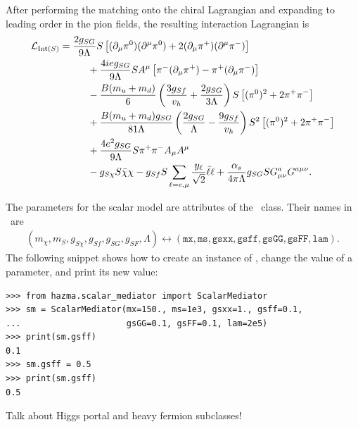 After performing the matching onto the chiral Lagrangian and expanding to leading order in the pion fields, the resulting interaction Lagrangian is
\begin{align}
    \mathcal{L}_{\mathrm{Int}(S)} &= \frac{2 g_{SG}}{9 \Lambda} S \left[ (\partial_\mu \pi^0) (\partial^\mu \pi^0) + 2 (\partial_\mu \pi^+) (\partial^\mu \pi^-) \right]\\
                         &\hspace{1cm} + \frac{4 i e g_{SG}}{9 \Lambda} S A^\mu \left[ \pi^- (\partial_\mu \pi^+) - \pi^+ (\partial_\mu \pi^-) \right]\\
                         &\hspace{1cm} - \frac{B (m_u + m_d)}{6} \left( \frac{3 g_{Sf}}{v_h} + \frac{2 g_{SG}}{3 \Lambda} \right) S \left[ (\pi^0)^2 + 2 \pi^+ \pi^- \right]\\
                         &\hspace{1cm} + \frac{B (m_u + m_d) g_{SG}}{81 \Lambda} \left( \frac{2 g_{SG}}{\Lambda} - \frac{9 g_{Sf}}{v_h} \right) S^2 \left[ (\pi^0)^2 + 2 \pi^+ \pi^- \right]\\
                         &\hspace{1cm} + \frac{4 e^2 g_{SG}}{9\Lambda} S \pi^+ \pi^- A_\mu A^\mu\\
                         &\hspace{1cm} - g_{S \chi} S \bar{\chi} \chi - g_{Sf} S \sum_{\ell=e,\mu} \frac{y_\ell}{\sqrt{2}} \bar{\ell} \ell + \frac{\alpha_s}{4\pi \Lambda} g_{SG} S G_{\mu\nu}^a G^{a \mu\nu}.
\end{align}

The parameters for the scalar model are attributes of the \sm\ class. Their names in \hazma\ are
\begin{align*}
    (m_\chi, m_S, g_{S\chi}, g_{Sf}, g_{SG}, g_{SF}, \Lambda) \leftrightarrow (\mathtt{mx}, \mathtt{ms}, \mathtt{gsxx}, \mathtt{gsff}, \mathtt{gsGG}, \mathtt{gsFF}, \mathtt{lam}).
\end{align*}
The following snippet shows how to create an instance of \sm, change the value of a parameter, and print its new value:
\begin{verbatim}
>>> from hazma.scalar_mediator import ScalarMediator
>>> sm = ScalarMediator(mx=150., ms=1e3, gsxx=1., gsff=0.1,
...                     gsGG=0.1, gsFF=0.1, lam=2e5)
>>> print(sm.gsff)
0.1
>>> sm.gsff = 0.5
>>> print(sm.gsff)
0.5
\end{verbatim}

{\color{red} Talk about Higgs portal and heavy fermion subclasses!}

